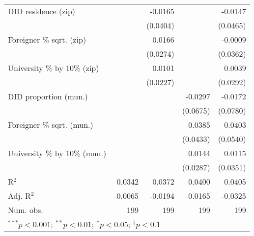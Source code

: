 \begin{tabular}{l D{.}{.}{3.5} D{.}{.}{3.11} D{.}{.}{3.11} D{.}{.}{3.11}}
DID residence (zip)               &             & -0.0165          &                  & -0.0147          \\
                                  &             & (0.0404)         &                  & (0.0465)         \\
Foreigner \% sqrt. (zip)          &             & 0.0166           &                  & -0.0009          \\
                                  &             & (0.0274)         &                  & (0.0362)         \\
University \% by 10\% (zip)       &             & 0.0101           &                  & 0.0039           \\
                                  &             & (0.0227)         &                  & (0.0292)         \\
DID proportion (mun.)             &             &                  & -0.0297          & -0.0172          \\
                                  &             &                  & (0.0675)         & (0.0780)         \\
Foreigner \% sqrt. (mun.)         &             &                  & 0.0385           & 0.0403           \\
                                  &             &                  & (0.0433)         & (0.0540)         \\
University \% by 10\% (mun.)      &             &                  & 0.0144           & 0.0115           \\
                                  &             &                  & (0.0287)         & (0.0351)         \\
\midrule
R$^2$                             & 0.0342      & 0.0372           & 0.0400           & 0.0405           \\
Adj. R$^2$                        & -0.0065     & -0.0194          & -0.0165          & -0.0325          \\
Num. obs.                         & 199         & 199              & 199              & 199              \\
\bottomrule
{}
\end{tabular}
